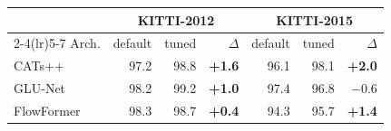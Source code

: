 \begin{tabular}{l rrr rrr}
\toprule
 & \multicolumn{3}{c}{KITTI-2012} & \multicolumn{3}{c}{KITTI-2015} \\
\cmidrule(lr){2-4}\cmidrule(lr){5-7}
Arch. & default & tuned & $\Delta$ & default & tuned & $\Delta$ \\
\midrule
CATs++     & 97.2 & 98.8 & \textbf{+1.6} & 96.1 & 98.1 & \textbf{+2.0} \\
GLU-Net    & 98.2 & 99.2 & \textbf{+1.0} & 97.4 & 96.8 & $-0.6$ \\
FlowFormer & 98.3 & 98.7 & \textbf{+0.4} & 94.3 & 95.7 & \textbf{+1.4} \\
\bottomrule
\end{tabular}
